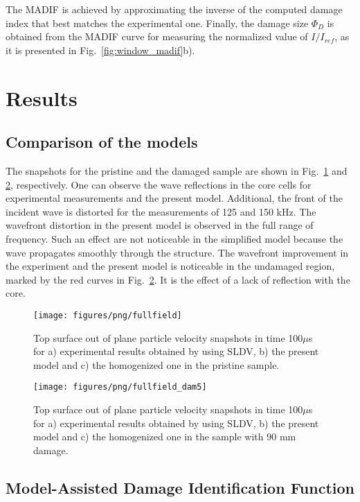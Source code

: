\documentclass[sensors,article,submit,moreauthors,pdftex]{Definitions/mdpi}
\begin{document}
The MADIF is achieved by approximating the inverse of the computed damage index that best matches the experimental one.
Finally, the damage size \(\Phi_D\) is obtained from the MADIF curve for measuring the normalized value of \(I/I_{ref}\), as it is presented in Fig.~\ref{fig:window_madif}b).
\color{black}
\section{Results}
\label{sec:results}
\subsection{Comparison of the models}
\label{comparison}
\color{red}
The snapshots for the pristine and the damaged sample are shown in Fig.~\ref{fig:wavefield} and \ref{fig:wavefield_dam5}, respectively.
One can observe the wave reflections in the core cells for experimental measurements and the present model. 
Additional, the front of the incident wave is distorted for the measurements of 125 and 150 kHz.
The wavefront distortion in the present model is observed in the full range of frequency. 
Such an effect are not noticeable in the simplified model because the wave propagates smoothly through the structure.
The wavefront improvement in the experiment and the present model is noticeable in the undamaged region, marked by the red curves in Fig.~\ref{fig:wavefield_dam5}.
It is the effect of a lack of reflection with the core.
\begin{figure}
	\begin{center}
		\texttt{[image: figures/png/fullfield]}
	\end{center}
	\caption{Top surface out of plane particle velocity snapshots in time 100\(\mu\)s for a) experimental results obtained by using SLDV, b) the present model and c) the homogenized one in the pristine sample.}
	\label{fig:wavefield}
\end{figure}
\begin{figure}
	\begin{center}
		\texttt{[image: figures/png/fullfield\_dam5]}
	\end{center}
	\caption{Top surface out of plane particle velocity snapshots in time 100\(\mu\)s for a) experimental results obtained by using SLDV, b) the present model and c) the homogenized one in the sample with 90 mm damage.}
	\label{fig:wavefield_dam5}
\end{figure}
\color{black}
\subsection{Model-Assisted Damage Identification Function}
\label{MADIF}
\end{document}
